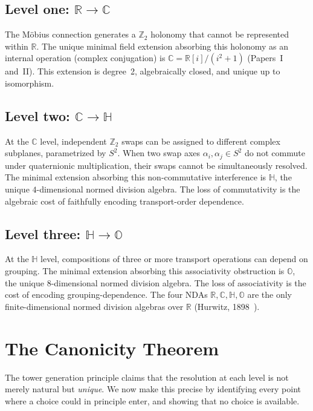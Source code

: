 \documentclass[12pt,a4paper]{article}
\theoremstyle{definition}
\theoremstyle{remark}
\newcommand{\Z}{\mathbb{Z}}
\newcommand{\R}{\mathbb{R}}
\newcommand{\C}{\mathbb{C}}
\newcommand{\HH}{\mathbb{H}}
\newcommand{\OO}{\mathbb{O}}
\begin{document}
\subsection{Level one: $\R \to \C$}

The M\"{o}bius connection generates a $\Z_2$ holonomy that cannot
be represented within $\R$. The unique minimal field extension
absorbing this holonomy as an internal operation (complex
conjugation) is $\C = \R[i]/(i^2 + 1)$
(Papers~I and~II). This extension is degree~2, algebraically
closed, and unique up to isomorphism.

\subsection{Level two: $\C \to \HH$}

At the $\C$ level, independent $\Z_2$ swaps can be assigned to
different complex subplanes, parametrized by $S^2$. When two
swap axes $\alpha_i, \alpha_j \in S^2$ do not commute under
quaternionic multiplication, their swaps cannot be simultaneously
resolved. The minimal extension absorbing this non-commutative
interference is $\HH$, the unique $4$-dimensional normed division
algebra. The loss of commutativity is the algebraic cost of
faithfully encoding transport-order dependence.

\subsection{Level three: $\HH \to \OO$}

At the $\HH$ level, compositions of three or more transport
operations can depend on grouping. The minimal extension absorbing
this associativity obstruction is $\OO$, the unique $8$-dimensional
normed division algebra. The loss of associativity is the cost of
encoding grouping-dependence. The four NDAs
$\R, \C, \HH, \OO$ are the only finite-dimensional normed division
algebras over $\R$ (Hurwitz, 1898~\cite{Hurwitz1898}).


\section{The Canonicity Theorem}
\label{sec:canonicity}

The tower generation principle claims that the resolution at each
level is not merely natural but \emph{unique}. We now make this
precise by identifying every point where a choice could in
principle enter, and showing that no choice is available.
\end{document}
